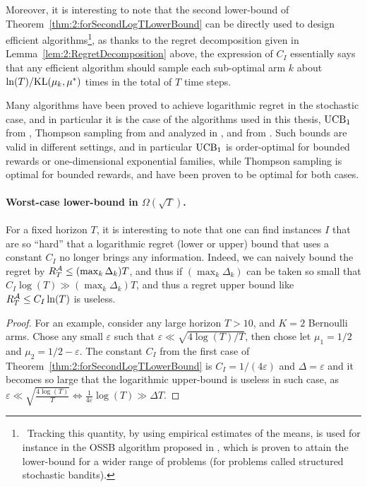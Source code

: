 Moreover, it is interesting to note that the second lower-bound of Theorem~\ref{thm:2:forSecondLogTLowerBound} can be directly used to design efficient algorithms\footnote{~Tracking this quantity, by using empirical estimates of the means, is used for instance in the OSSB algorithm proposed in \cite{Combes17}, which is proven to attain the lower-bound for a wider range of problems (for problems called structured stochastic bandits).}, as thanks to the regret decomposition given in Lemma~\ref{lem:2:RegretDecomposition} above, the expression of $C_I$ essentially says that any efficient algorithm
should sample each sub-optimal arm $k$ about $\ln(T)/\mathrm{KL}(\mu_k,\mu^*)$ times in the total of $T$ time steps.


Many algorithms have been proved to achieve logarithmic regret in the stochastic case,
and in particular it is the case of the algorithms used in this thesis, $\mathrm{UCB}_1$ from \cite{Auer02}, Thompson sampling from \cite{Thompson33} and analyzed in \cite{AgrawalGoyal11,Kaufmann12Thompson}, and \klUCB{} from \cite{Garivier11KL,KLUCBJournal}.
%
Such bounds are valid in different settings, and in particular $\mathrm{UCB}_1$ is order-optimal for bounded rewards or one-dimensional exponential families,
while Thompson sampling is optimal for bounded rewards, and \klUCB{} have been proven to be optimal for both cases.


\paragraph{Worst-case lower-bound in $\Omega(\sqrt{T})$.}
%
For a fixed horizon $T$, it is interesting to note that one can find instances $I$ that are so ``hard'' that a logarithmic regret (lower or upper) bound that uses a constant $C_I$ no longer brings any information.
Indeed, we can naively bound the regret by $R_T^{\mathcal{A}} \leq (\max_k \Delta_k) T$, and thus if $(\max_k \Delta_k)$ can be taken so small that $C_I \log(T) \gg (\max_k \Delta_k) T$, and thus a regret upper bound like $R_T^{\mathcal{A}} \leq C_I \ln(T)$ is useless.
%
\begin{proof}
    For an example, consider any large horizon $T>10$, and $K=2$ Bernoulli arms.
    Chose any small $\varepsilon$ such that $\varepsilon \ll \sqrt{4 \log(T) / T}$, then chose let $\mu_1 = 1/2$ and $\mu_2 = 1/2 - \varepsilon$.
    The constant $C_I$ from the first case of Theorem~\ref{thm:2:forSecondLogTLowerBound} is $C_I = 1 / (4 \varepsilon)$ and $\Delta=\varepsilon$ and it becomes so large that
    the logarithmic upper-bound is useless in such case, as
    $\varepsilon \ll \sqrt{\frac{4 \log(T)}{T}} \Longleftrightarrow \frac{1}{4\varepsilon} \log(T) \gg \Delta T$.
\end{proof}

